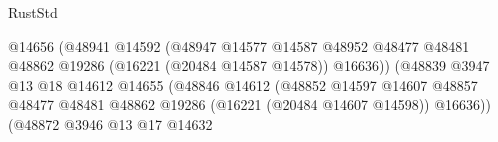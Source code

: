 \begin{lexlean}{RustStd}
\begin{coremodule}
                                                              @14656
                                                              (@48941
                                                                @14592
                                                                (@48947
                                                                  @14577
                                                                  @14587
                                                                  @48952
                                                                  @48477
                                                                  @48481
                                                                  @48862
                                                                  @19286
                                                                  (@16221 (@20484 @14587 @14578))
                                                                  @16636))
                                                              (@48839
                                                                @3947
                                                                @13
                                                                @18
                                                                @14612
                                                                @14655
                                                                (@48846
                                                                  @14612
                                                                  (@48852
                                                                    @14597
                                                                    @14607
                                                                    @48857
                                                                    @48477
                                                                    @48481
                                                                    @48862
                                                                    @19286
                                                                    (@16221 (@20484 @14607 @14598))
                                                                    @16636))
                                                                (@48872
                                                                  @3946
                                                                  @13
                                                                  @17
                                                                  @14632

\end{coremodule}
\end{lexlean}
